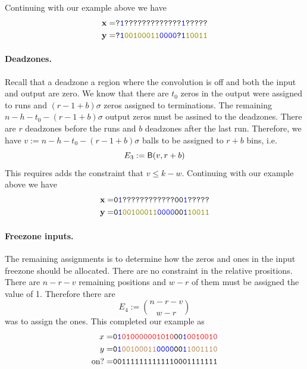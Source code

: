 Continuing with our example above we have
\begin{align*}
    \xv=&\texttt{?\blue{1}?????????????\blue{1}?????}\\
    \yv=&\texttt{?\blue{1}\olive{00100011}\blue{0000}?\blue{1}\olive{10011}}
\end{align*}

\paragraph{Deadzones.} Recall that a deadzone a region where the convolution is off and both the input and output are zero. We know that there are $t_0$ zeros in the output were assigned to runs and $(r-1+b)\sigma$ zeros assigned to terminations. The remaining $n-h-t_0-(r-1+b)\sigma$ output zeros must be assined to the deadzones. There are $r$ deadzones before the runs and $b$ deadzones after the last run. Therefore, we have
$v:=n-h-t_0-(r-1+b)\sigma$ balls to be assigned to $r+b$ bins, i.e.
$$
E_3:= \mathsf{B}(v,r+b)
$$
This requires adds the constraint that $v\leq k-w$.
Continuing with our example above we have
\begin{align*}
    \xv=&\texttt{0\blue{1}????????????00\blue{1}?????}\\
    \yv=&\texttt{0\blue{1}\olive{00100011}\blue{0000}00\blue{1}\olive{10011}}
\end{align*}


\paragraph{Freezone inputs.} The remaining assignments is to determine how the zeros and ones in the input freezone should be allocated. There are no constraint in the relative prositions. There are $n-r-v$ remaining positions and $w-r$ of them must be assigned the value of 1. Therefore there are
$$
E_4:=\binom{n-r-v}{w-r}
$$
was to assign the ones. This completed our example as
\begin{align*}
    x= & \texttt{0\textcolor{blue}{1}\textcolor{red}{010000001010}00\textcolor{blue}{1}\textcolor{red}{0010010}}\\
    y= & \texttt{0\textcolor{blue}{1}\textcolor{brown}{00100011}\textcolor{blue}{0000}00\textcolor{blue}{1}\textcolor{brown}{1001110}}\\
    \text{on?}= & \texttt{001111111111110001111111}
\end{align*}

